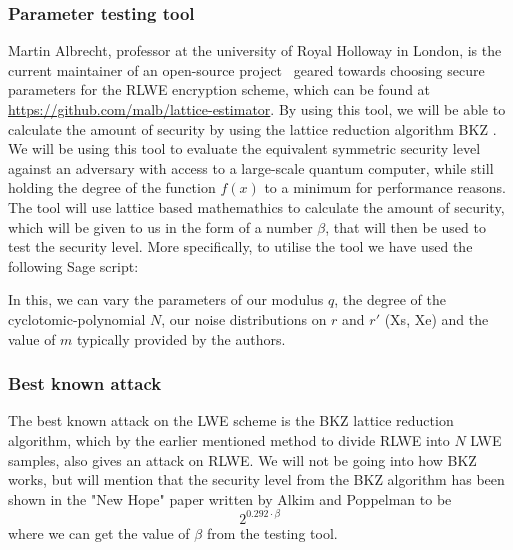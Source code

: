 \documentclass[../main.tex]{subfiles}
\begin{document}
    \subsubsection{Parameter testing tool} \label{sec:lattice-reduction}
        Martin Albrecht, professor at the university of Royal Holloway in London, is the current maintainer of an open-source project~\cite{cryptoeprint:2015:046} geared towards choosing secure parameters for the RLWE encryption scheme, which can be found at \url{https://github.com/malb/lattice-estimator}.
		By using this tool, we will be able to calculate the amount of security by using the lattice reduction algorithm BKZ \cite{alkim2016post}.
		We will be using this tool to evaluate the equivalent symmetric security level against an adversary with access to a large-scale quantum computer,
		while still holding the degree of the function $f(x)$ to a minimum for performance reasons.
		The tool will use lattice based mathemathics to calculate the amount of security, which will be given
		to us in the form of a number $\beta$, that will then be used to test the security level.
        More specifically, to utilise the tool we have used the following Sage script:
        
        In this, we can vary the parameters of our modulus $q$, the degree of the cyclotomic-polynomial $N$,
        our noise distributions on $r$ and $r'$ (Xs, Xe) and the value of $m$ typically provided by the authors.

    \subsubsection{Best known attack}
		The best known attack on the LWE scheme is the BKZ lattice reduction algorithm, which by the earlier mentioned method to divide RLWE into $N$ LWE samples, also gives an attack on RLWE.
		We will not be going into how BKZ works, but will mention that the security level from the BKZ algorithm
		has been shown in the "New Hope" paper \cite{alkim2016post} written by Alkim and Poppelman to be
		\[ 2^{0.292 \cdot \beta} \]
		where we can get the value of $\beta$ from the testing tool.
\end{document}
